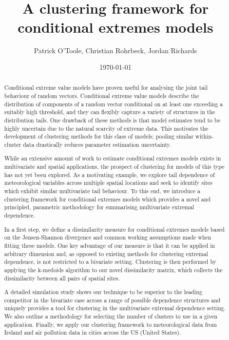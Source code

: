 \documentclass{article}
\title{A clustering framework for conditional extremes models}
\author{Patrick O'Toole, Christian Rohrbeck, Jordan Richards}
\date{\today}
\numberwithin{equation}{section}
\begin{document}
\maketitle



\begin{abstract}
 Conditional extreme value models have proven useful for analysing the joint tail behaviour of random vectors. 
 Conditional extreme value models describe the distribution of components of a random vector conditional on at least one exceeding a suitably high threshold, and they can flexibly capture a variety of structures in the distribution tails.
 One drawback of these methods is that model estimates tend to be highly uncertain due to the natural scarcity of extreme data. 
 This motivates the development of clustering methods for this class of models; pooling similar within-cluster data drastically reduces parameter estimation uncertainty.
 
 While an extensive amount of work to estimate conditional extremes models exists in multivariate and spatial applications, the prospect of clustering for models of this type has not yet been explored. 
 As a motivating example, we explore tail dependence of meteorological variables across multiple spatial locations and seek to identify sites which exhibit similar multivariate tail behaviour. 
 To this end, we introduce a clustering framework for conditional extremes models which provides a novel and principled, parametric methodology for summarising multivariate extremal dependence.
 
 In a first step, we define a dissimilarity measure for conditional extremes models based on the Jensen-Shannon divergence and common working assumptions made when fitting these models. 
 One key advantage of our measure is that it can be applied in arbitrary dimension and, as opposed to existing methods for clustering extremal dependence, is not restricted to a bivariate setting. 
 Clustering is then performed by applying the k-medoids algorithm to our novel dissimilarity matrix, which collects the dissimilarity between all pairs of spatial sites. 
 
 A detailed simulation study shows our technique to be superior to the leading competitor in the bivariate case across a range of possible dependence structures and uniquely provides a tool for clustering in the multivariate extremal dependence setting. 
 We also outline a methodology for selecting the number of clusters to use in a given application.  Finally, we apply our clustering framework to meteorological data from Ireland and air pollution data in cities across the US (United States). 

\end{abstract}
\end{document}
